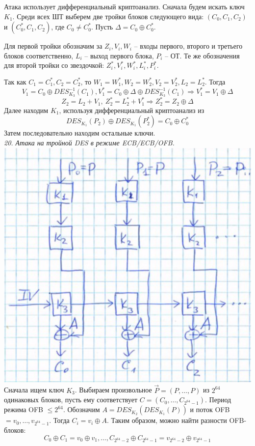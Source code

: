 Атака использует дифференциальный криптоанализ. Сначала будем искать ключ $K_1$. Среди всех ШТ выберем две тройки блоков следующего вида: $(C_0, C_1, C_2)$ и $(C_0^*, C_1, C_2)$, где $C_0 \ne C_0^*$. Пусть $\Delta = C_0 \oplus C_0^*$.

Для первой тройки обозначим за $Z_i, V_i, W_i$ -- входы первого, второго и третьего блоков соответственно, $L_i$ -- выход первого блока, $P_i$ -- ОТ. Те же обозначения для второй тройки со звездочкой: $Z_i^*, V_i^*, W_i^*, L_i^*, P_i^*$.

Так как $C_1 = C_1^*, C_2 = C_2^*$, то $W_1 = W_1^*, W_2 = W_2^*, V_2 = V_2^*, L_2 = L_2^*$.
Тогда
$$V_1 = C_0 \oplus DES_{K_3}^{-1}(C_1), V_1^* = C_0 \oplus \Delta \oplus DES_{K_3}^{-1}(C_1) \Rightarrow V_1^* = V_1 \oplus \Delta$$
$$Z_2 = L_2 + V_1,\ Z_2^* = L_2^* + V_1^* \Rightarrow Z_2^* = Z_2 \oplus \Delta$$
Далее находим $K_1$, используя дифференциальный криптоанализ из
$$DES_{K_1}(P_2) \oplus DES_{K_1}(P_2^*) = C_0 \oplus C_0^*$$
Затем последовательно находим остальные ключи. \\

\newpage
\noindent \textit{20. Атака на тройной DES в режиме ECB/ECB/OFB.} \\

\includegraphics[scale=.5]{eka/img/ECB_ECB_OFB.png} \\

Сначала ищем ключ $K_3$. Выбираем произвольное $\vec P = (P, \ldots, P)$ из $2^{64}$ одинаковых блоков, пусть ему соответствует $C = (C_0, \ldots, C_{2^{64}-1})$. Период режима OFB $\le 2^{64}$.
Обозначим $A = DES_{K_2}(DES_{K_1}(P))$ и поток OFB $= v_0,\ldots,v_{2^{64}-1}$. Тогда $C_i = v_i \oplus A$. Таким образом, можно найти разности OFB-блоков:
$$C_0 \oplus C_1 = v_0 \oplus v_1, \ldots, C_{2^{64}-2} \oplus C_{2^{64}-1} = v_{2^{64}-2} \oplus v_{2^{64}-1}$$

